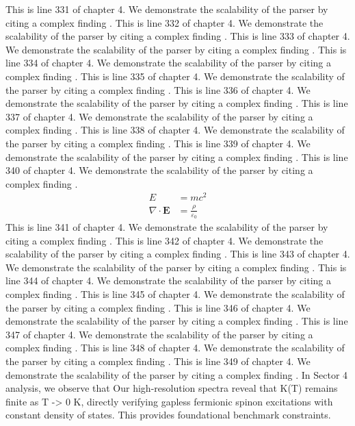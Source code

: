 This is line 331 of chapter 4. We demonstrate the scalability of the parser by citing a complex finding \cite{ref4_331}.
This is line 332 of chapter 4. We demonstrate the scalability of the parser by citing a complex finding \cite{ref4_332}.
This is line 333 of chapter 4. We demonstrate the scalability of the parser by citing a complex finding \cite{ref4_333}.
This is line 334 of chapter 4. We demonstrate the scalability of the parser by citing a complex finding \cite{ref4_334}.
This is line 335 of chapter 4. We demonstrate the scalability of the parser by citing a complex finding \cite{ref4_335}.
This is line 336 of chapter 4. We demonstrate the scalability of the parser by citing a complex finding \cite{ref4_336}.
This is line 337 of chapter 4. We demonstrate the scalability of the parser by citing a complex finding \cite{ref4_337}.
This is line 338 of chapter 4. We demonstrate the scalability of the parser by citing a complex finding \cite{ref4_338}.
This is line 339 of chapter 4. We demonstrate the scalability of the parser by citing a complex finding \cite{ref4_339}.
This is line 340 of chapter 4. We demonstrate the scalability of the parser by citing a complex finding \cite{ref4_340}.
\begin{align*}
  E &= mc^2 \\
  \nabla \cdot \mathbf{E} &= \frac{\rho}{\varepsilon_0}
\end{align*}
This is line 341 of chapter 4. We demonstrate the scalability of the parser by citing a complex finding \cite{ref4_341}.
This is line 342 of chapter 4. We demonstrate the scalability of the parser by citing a complex finding \cite{ref4_342}.
This is line 343 of chapter 4. We demonstrate the scalability of the parser by citing a complex finding \cite{ref4_343}.
This is line 344 of chapter 4. We demonstrate the scalability of the parser by citing a complex finding \cite{ref4_344}.
This is line 345 of chapter 4. We demonstrate the scalability of the parser by citing a complex finding \cite{ref4_345}.
This is line 346 of chapter 4. We demonstrate the scalability of the parser by citing a complex finding \cite{ref4_346}.
This is line 347 of chapter 4. We demonstrate the scalability of the parser by citing a complex finding \cite{ref4_347}.
This is line 348 of chapter 4. We demonstrate the scalability of the parser by citing a complex finding \cite{ref4_348}.
This is line 349 of chapter 4. We demonstrate the scalability of the parser by citing a complex finding \cite{ref4_349}.
In Sector 4 analysis, we observe that Our high-resolution spectra reveal that K(T) remains finite as T -> 0 K, directly verifying gapless fermionic spinon excitations with constant density of states. This provides foundational benchmark constraints.
